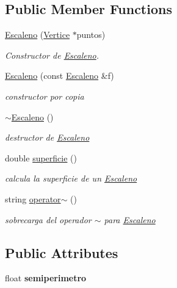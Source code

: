 \subsection*{Public Member Functions}
\begin{DoxyCompactItemize}
\item 
\hyperlink{class_escaleno_a2670875a1c4940661ea68fb97a8e2da1}{Escaleno} (\hyperlink{class_vertice}{Vertice} $\ast$puntos)
\begin{DoxyCompactList}\small\item\em Constructor de \hyperlink{class_escaleno}{Escaleno}. \end{DoxyCompactList}\item 
\hyperlink{class_escaleno_a533113f78f16d04e821724f1ae373a19}{Escaleno} (const \hyperlink{class_escaleno}{Escaleno} \&f)
\begin{DoxyCompactList}\small\item\em constructor por copia \end{DoxyCompactList}\item 
\mbox{\label{class_escaleno_a49f27943915cf764e133b4ebd24ca060}} 
\hyperlink{class_escaleno_a49f27943915cf764e133b4ebd24ca060}{$\sim$\+Escaleno} ()
\begin{DoxyCompactList}\small\item\em destructor de \hyperlink{class_escaleno}{Escaleno} \end{DoxyCompactList}\item 
\mbox{\label{class_escaleno_a7d71f0f712f7673eca014f1821b78846}} 
double \hyperlink{class_escaleno_a7d71f0f712f7673eca014f1821b78846}{superficie} ()
\begin{DoxyCompactList}\small\item\em calcula la superficie de un \hyperlink{class_escaleno}{Escaleno} \end{DoxyCompactList}\item 
\mbox{\label{class_escaleno_a083472de2f48b2d3da5e11a4d33be38a}} 
string \hyperlink{class_escaleno_a083472de2f48b2d3da5e11a4d33be38a}{operator$\sim$} ()
\begin{DoxyCompactList}\small\item\em sobrecarga del operador $\sim$ para \hyperlink{class_escaleno}{Escaleno} \end{DoxyCompactList}\end{DoxyCompactItemize}
\subsection*{Public Attributes}
\begin{DoxyCompactItemize}
\item 
\mbox{\label{class_escaleno_aa7147d8466b9cd87a787a898fed69eec}} 
float {\bfseries semiperimetro}
\end{DoxyCompactItemize}
